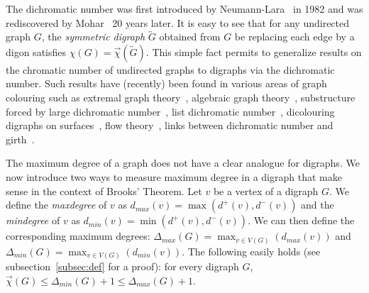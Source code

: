 \documentclass[11pt]{article}
\newcommand{\dic}{\vec{\chi}}
\newcommand{\olra}{\overleftrightarrow}
\newcommand{\gd}{\tilde{\Delta}}
\newcommand{\ad}{\bar{\Delta}}
\newcommand{\dmax}{\Delta_{max}}
\newcommand{\dmin}{\Delta_{min}}
\newcommand{\PA}[1]{{\color{blue}{\bf PA:} #1}}
\begin{document}
The dichromatic number was first introduced by Neumann-Lara~\cite{NL82} in 1982 and was  rediscovered by Mohar~\cite{M03} 20 years later.
It is easy to see that for any undirected graph $G$, the \textit{symmetric digraph} $\olra G$ obtained from $G$ be replacing each edge by a digon satisfies $\chi(G) = \dic(\olra G)$. This simple fact permits to generalize results on the chromatic number of undirected graphs to digraphs via the dichromatic number. Such results have (recently) been found in various areas of graph colouring such as extremal graph theory~\cite{BBSS20, HK15, KS20}, algebraic graph theory~\cite{M10}, substructure forced by large dichromatic number~\cite{AAC21, ACN21, ACL19, hero,GSS20, HLNT19, S21}, list dichromatic number~\cite{BHL18, HM11}, dicolouring digraphs on surfaces~\cite{AHKR21, LM17, S19}, flow theory~\cite{H17, KV12}, links between dichromatic number and girth~\cite{HM12, S20}. 
\medskip


The maximum degree of a graph does not have a clear analogue for digraphs. 
We now introduce two ways to measure maximum degree in a digraph that make sense in the context of Brooks' Theorem.  
Let $v$ be a vertex of a digraph $G$. 
We define the \emph{maxdegree} of $v$ as $d_{max}(v)= \max(d^+(v), d^-(v))$ and the \emph{mindegree} of $v$ as $d_{min}(v)= \min(d^+(v), d^-(v))$.
We can then define the corresponding maximum degrees: $\Delta_{max}(G)= \max_{v \in V(G)}(d_{max}(v))$ and $\Delta_{min}(G)= \max_{v \in V(G)}(d_{min}(v))$. 
The following easily holds (see subsection~\ref{subsec:def} for a proof): for every digraph $G$, $\dic(G) \leq \dmin(G) +1 \leq \dmax(G) +1$. 
 
\end{document}

